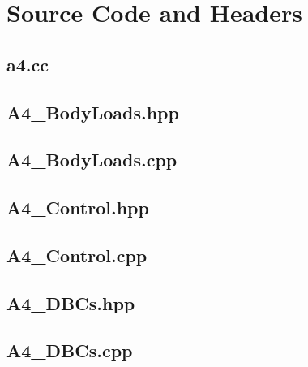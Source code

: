 \documentclass[a4paper, 12pt]{article}
\begin{document}
\newpage
\appendix
\section{Source Code and Headers} \label{sec:code}

\subsection{a4.cc} \label{subsec:a4.cc}


\newpage
\subsection{A4\_BodyLoads.hpp} \label{subsec:BLhpp}


\newpage
\subsection{A4\_BodyLoads.cpp} \label{subsec:BLcpp}


\newpage
\subsection{A4\_Control.hpp} \label{subsec:Cont.hpp}


\newpage
\subsection{A4\_Control.cpp} \label{subsec:Cont.cpp}


\newpage
\subsection{A4\_DBCs.hpp} \label{subsec:DBCs.hpp}


\newpage
\subsection{A4\_DBCs.cpp} \label{subsec:DBCs.cpp}

\end{document}
